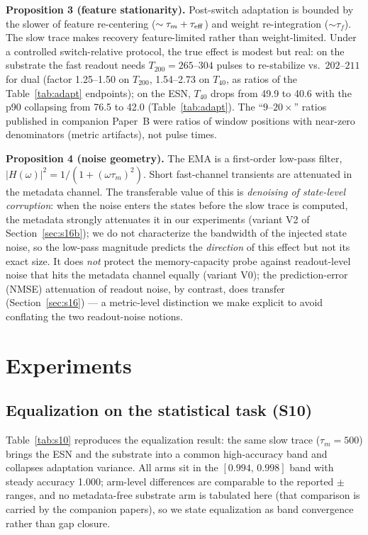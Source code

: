 \documentclass[preprint,12pt]{elsarticle}
\begin{document}
{\sloppy
\textbf{Proposition 3 (feature stationarity).} Post-switch adaptation is
bounded by the slower of feature re-centering ($\sim \tau_m + \tau_{\rm
eff}$) and weight re-integration ($\sim \tau_f$). The slow trace makes
recovery feature-limited rather than weight-limited. Under a controlled
switch-relative protocol, the true effect is modest but real: on the
substrate the fast readout needs $T_{200}=265$--$304$ pulses to
re-stabilize vs.\ $202$--$211$ for dual (factor 1.25--1.50 on $T_{200}$,
1.54--2.73 on $T_{40}$, as ratios of the Table~\ref{tab:adapt} endpoints);
on the ESN, $T_{40}$ drops from 49.9 to 40.6 with
the p90 collapsing from 76.5 to 42.0 (Table~\ref{tab:adapt}). The
``$9$--$20\times$'' ratios published in companion Paper~B were ratios of
window positions with near-zero denominators (metric artifacts), not
pulse times.\par}

\textbf{Proposition 4 (noise geometry).} The EMA is a first-order low-pass
filter, $|H(\omega)|^2 = 1/(1+(\omega\tau_m)^2)$. Short fast-channel
transients are attenuated in the metadata channel. The transferable value
of this is \emph{denoising of state-level corruption}: when the noise
enters the states before the slow trace is computed, the metadata strongly
attenuates it in our experiments (variant V2 of Section~\ref{sec:s16b});
we do not characterize the bandwidth of the injected state noise, so the
low-pass magnitude predicts the \emph{direction} of this effect but not
its exact size. It does \emph{not} protect the memory-capacity probe
against readout-level noise that hits the metadata channel equally
(variant V0); the prediction-error (NMSE) attenuation of readout noise,
by contrast, does transfer (Section~\ref{sec:s16}) --- a metric-level
distinction we make explicit to avoid conflating the two readout-noise
notions.

\section{Experiments}
\label{sec:exp}

\subsection{Equalization on the statistical task (S10)}
\label{sec:s10}

Table~\ref{tab:s10} reproduces the equalization result: the same slow
trace ($\tau_m=500$) brings the ESN and the substrate into a common
high-accuracy band and collapses adaptation variance. All arms sit in the
$[0.994,\,0.998]$ band with steady accuracy 1.000; arm-level differences
are comparable to the reported $\pm$ ranges, and no metadata-free
substrate arm is tabulated here (that comparison is carried by the
companion papers), so we state equalization as band convergence rather
than gap closure.
\end{document}
